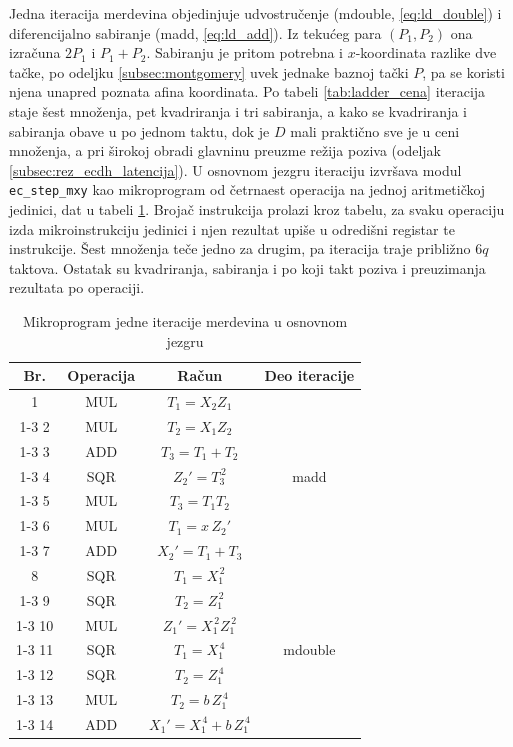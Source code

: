 Jedna iteracija merdevina objedinjuje udvostručenje (mdouble, \eqref{eq:ld_double}) i diferencijalno sabiranje (madd, \eqref{eq:ld_add}). Iz tekućeg para $(P_1, P_2)$ ona izračuna $2P_1$ i $P_1 + P_2$. Sabiranju je pritom potrebna i $x$-koordinata razlike dve tačke, po odeljku \ref{subsec:montgomery} uvek jednake baznoj tački $P$, pa se koristi njena unapred poznata afina koordinata. Po tabeli \ref{tab:ladder_cena} iteracija staje šest množenja, pet kvadriranja i tri sabiranja, a kako se kvadriranja i sabiranja obave u po jednom taktu, dok je $D$ mali praktično sve je u ceni množenja, a pri širokoj obradi glavninu preuzme režija poziva (odeljak \ref{subsec:rez_ecdh_latencija}).
\smallbreak
U osnovnom jezgru iteraciju izvršava modul \texttt{ec\_step\_mxy} kao mikroprogram od četrnaest operacija na jednoj aritmetičkoj jedinici, dat u tabeli \ref{tab:ecdh_mikroprogram}. Brojač instrukcija prolazi kroz tabelu, za svaku operaciju izda mikroinstrukciju jedinici i njen rezultat upiše u odredišni registar te instrukcije. Šest množenja teče jedno za drugim, pa iteracija traje približno $6q$ taktova. Ostatak su kvadriranja, sabiranja i po koji takt poziva i preuzimanja rezultata po operaciji.

\begin{table}[H]
\caption{Mikroprogram jedne iteracije merdevina u osnovnom jezgru}
\centering
{\renewcommand{\arraystretch}{1.15}\small
\begin{tabular}{|c|c|c|c|}
\hline
\rowcolor{gray!30}
Br. & Operacija & Račun & Deo iteracije \\
\hline
1 & MUL & $T_1 = X_2 Z_1$ & \multirow{7}{*}{madd} \\
\cline{1-3}
2 & MUL & $T_2 = X_1 Z_2$ & \\
\cline{1-3}
3 & ADD & $T_3 = T_1 + T_2$ & \\
\cline{1-3}
4 & SQR & $Z_2' = T_3^{\,2}$ & \\
\cline{1-3}
5 & MUL & $T_3 = T_1 T_2$ & \\
\cline{1-3}
6 & MUL & $T_1 = x\,Z_2'$ & \\
\cline{1-3}
7 & ADD & $X_2' = T_1 + T_3$ & \\
\hline
8 & SQR & $T_1 = X_1^{\,2}$ & \multirow{7}{*}{mdouble} \\
\cline{1-3}
9 & SQR & $T_2 = Z_1^{\,2}$ & \\
\cline{1-3}
10 & MUL & $Z_1' = X_1^{\,2} Z_1^{\,2}$ & \\
\cline{1-3}
11 & SQR & $T_1 = X_1^{\,4}$ & \\
\cline{1-3}
12 & SQR & $T_2 = Z_1^{\,4}$ & \\
\cline{1-3}
13 & MUL & $T_2 = b\,Z_1^{\,4}$ & \\
\cline{1-3}
14 & ADD & $X_1' = X_1^{\,4} + b\,Z_1^{\,4}$ & \\
\hline
\end{tabular}
}
\label{tab:ecdh_mikroprogram}
\end{table}

